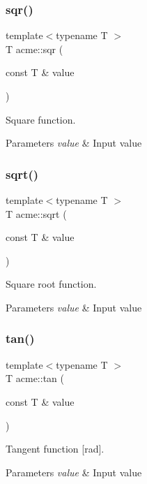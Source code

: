 \subsubsection{\texorpdfstring{sqr()}{sqr()}}
{\footnotesize\ttfamily template$<$typename T $>$ \\
T acme\+::sqr (\begin{DoxyParamCaption}\item[{const T \&}]{value }\end{DoxyParamCaption})\hspace{0.3cm}{\ttfamily [inline]}}



Square function. 


\begin{DoxyParams}{Parameters}
{\em value} & Input value \\
\hline
\end{DoxyParams}
\mbox{\label{namespaceacme_a6727bc4e9b202cb40e59065a01d9368b}} 
\subsubsection{\texorpdfstring{sqrt()}{sqrt()}}
{\footnotesize\ttfamily template$<$typename T $>$ \\
T acme\+::sqrt (\begin{DoxyParamCaption}\item[{const T \&}]{value }\end{DoxyParamCaption})\hspace{0.3cm}{\ttfamily [inline]}}



Square root function. 


\begin{DoxyParams}{Parameters}
{\em value} & Input value \\
\hline
\end{DoxyParams}
\mbox{\label{namespaceacme_a0fa0c6c9aef80a18fe865938fa2cb01d}} 
\subsubsection{\texorpdfstring{tan()}{tan()}}
{\footnotesize\ttfamily template$<$typename T $>$ \\
T acme\+::tan (\begin{DoxyParamCaption}\item[{const T \&}]{value }\end{DoxyParamCaption})\hspace{0.3cm}{\ttfamily [inline]}}



Tangent function \mbox{[}rad\mbox{]}. 


\begin{DoxyParams}{Parameters}
{\em value} & Input value \\
\hline
\end{DoxyParams}
